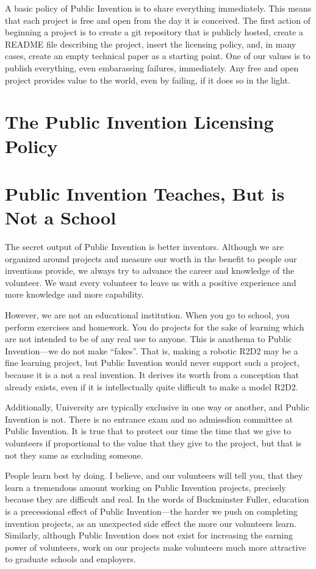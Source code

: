 \documentclass[
	fontsize=10pt, %
	twoside=false, %
	secnumdepth=1, %
]{kaobook}
\begin{document}
A basic policy of Public Invention is to share everything immediately.
This means that each project is free and open from the day it is conceived.
The first action of beginning a project is to create a git repository that
is publicly hosted, create a README file describing the project,
insert the licensing policy, and, in many cases, create an empty
technical paper as a starting point.
One of our values is to publish everything, even embarassing failures,
immediately.
Any free and open project provides value to the world, even by failing,
if it does so in the light.

\section{The Public Invention Licensing Policy}

\section{Public Invention Teaches, But is Not a School}

The secret output of Public Invention is better inventors.
Although we are organized around projects and
measure our worth in the benefit to people our inventions provide,
we always try to advance the career and knowledge of the volunteer.
We want every volunteer to leave us with a positive experience
and more knowledge and more capability.

However, we are not an educational institution.
When you go to school, you perform exercises and homework.
You do projects for the sake of learning which are not
intended to be of any real use to anyone.
This is anathema to Public Invention---we do not make ``fakes''.
That is, making a robotic R2D2 may be a fine learning
project, but Public Invention would never support such
a project, because it is a not a real invention.
It derives its worth from a conception that already exists,
even if it is intellectually quite difficult to make a model R2D2.

Additionally, University are typically exclusive in one way
or another, and Public Invention is not.
There is no entrance exam and no admissdion committee at Public Invention.
It is true that to protect our time the time that we give
to volunteers if proportional to the value that they give to the project,
but that is not they same as excluding someone.

People learn best by doing. I believe, and our volunteers
will tell you, that they learn a tremendous amount working
on Public Invention projects, precisely because they are difficult and real.
In the words of Buckminster Fuller, education is a precessional effect
of Public Invention---the harder we push on completing invention projects,
as an unexpected side effect the more our volunteers learn.
Similarly, although Public Invention does not exist for increasing the
earning power of volunteers, work on our projects make volunteers much more
attractive to graduate schools and employers.
\end{document}
